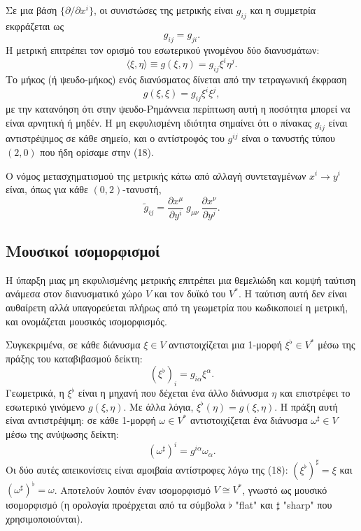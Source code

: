 \documentclass[12pt]{article}
\begin{document}
Σε μια βάση \( \{ \partial / \partial x^i \} \), οι συνιστώσες της μετρικής είναι \( g_{ij} \) και η συμμετρία εκφράζεται ως
\begin{equation}
g_{ij} = g_{ji}. \tag{24}
\end{equation}
Η μετρική επιτρέπει τον ορισμό του εσωτερικού γινομένου δύο διανυσμάτων:
\begin{equation}
\langle \xi, \eta \rangle \equiv g(\xi, \eta) = g_{ij} \xi^i \eta^j. \tag{25}
\end{equation}
Το μήκος (ή ψευδο-μήκος) ενός διανύσματος δίνεται από την τετραγωνική έκφραση
\begin{equation}
g(\xi, \xi) = g_{ij} \xi^i \xi^j, \tag{26}
\end{equation}
με την κατανόηση ότι στην ψευδο-Ρημάννεια περίπτωση αυτή η ποσότητα μπορεί να είναι αρνητική ή μηδέν. Η μη εκφυλισμένη ιδιότητα σημαίνει ότι ο πίνακας \( g_{ij} \) είναι αντιστρέψιμος σε κάθε σημείο, και ο αντίστροφός του \( g^{ij} \) είναι ο τανυστής τύπου \( (2,0) \) που ήδη ορίσαμε στην (18).

Ο νόμος μετασχηματισμού της μετρικής κάτω από αλλαγή συντεταγμένων \( x^i \to y^i \) είναι, όπως για κάθε \( (0,2) \)-τανυστή,
\begin{equation}
\tilde{g}_{ij} = \frac{\partial x^\mu}{\partial y^i} \ g_{\mu\nu} \ \frac{\partial x^\nu}{\partial y^j}. \tag{27}
\end{equation}

\subsection{Μουσικοί ισομορφισμοί}

Η ύπαρξη μιας μη εκφυλισμένης μετρικής επιτρέπει μια θεμελιώδη και κομψή ταύτιση ανάμεσα στον διανυσματικό χώρο \( V \) και τον δυϊκό του \( V^* \). Η ταύτιση αυτή δεν είναι αυθαίρετη αλλά υπαγορεύεται πλήρως από τη γεωμετρία που κωδικοποιεί η μετρική, και ονομάζεται μουσικός ισομορφισμός.

Συγκεκριμένα, σε κάθε διάνυσμα \( \xi \in V \) αντιστοιχίζεται μια 1-μορφή \( \xi^\flat \in V^* \) μέσω της πράξης του καταβιβασμού δείκτη:
\begin{equation}
(\xi^\flat)_i = g_{i\alpha} \xi^\alpha. \tag{28}
\end{equation}
Γεωμετρικά, η \( \xi^\flat \) είναι η μηχανή που δέχεται ένα άλλο διάνυσμα \( \eta \) και επιστρέφει το εσωτερικό γινόμενο \( g(\xi, \eta) \). Με άλλα λόγια, \( \xi^\flat(\eta) = g(\xi, \eta) \). Η πράξη αυτή είναι αντιστρέψιμη: σε κάθε 1-μορφή \( \omega \in V^* \) αντιστοιχίζεται ένα διάνυσμα \( \omega^\sharp \in V \) μέσω της ανύψωσης δείκτη:
\begin{equation}
(\omega^\sharp)^i = g^{i\alpha} \omega_\alpha. \tag{29}
\end{equation}
Οι δύο αυτές απεικονίσεις είναι αμοιβαία αντίστροφες λόγω της (18): \( (\xi^\flat)^\sharp = \xi \) και \( (\omega^\sharp)^\flat = \omega \). Αποτελούν λοιπόν έναν ισομορφισμό \( V \cong V^* \), γνωστό ως μουσικό ισομορφισμό (η ορολογία προέρχεται από τα σύμβολα \( \flat \) "flat" και \( \sharp \) "sharp" που χρησιμοποιούνται).
\end{document}

